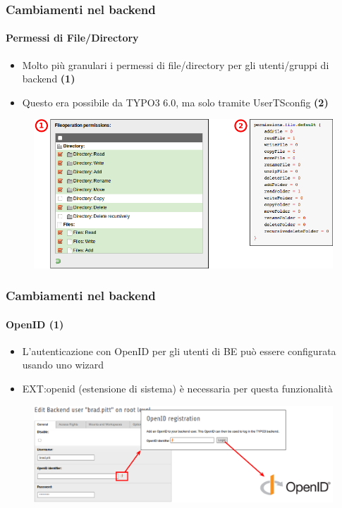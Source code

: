
\begin{frame}[fragile]
	\frametitle{Cambiamenti nel backend}
	\framesubtitle{Permessi di File/Directory}

 	\begin{itemize}
		\item Molto più granulari i permessi di file/directory per gli utenti/gruppi di backend
			\begingroup\color{typo3red}\textbf{(1)}\endgroup
		\item Questo era possibile da TYPO3 6.0, ma solo tramite UserTSconfig
			\begingroup\color{typo3red}\textbf{(2)}\endgroup
	\end{itemize}

	\begin{figure}
		\includegraphics[width=0.75\linewidth]{Images/BackendChanges/FileAndDirectoryPermissions.png}
	\end{figure}

\end{frame}


\begin{frame}[fragile]
	\frametitle{Cambiamenti nel backend}
	\framesubtitle{OpenID (1)}

 	\begin{itemize}
		\item L'autenticazione con OpenID per gli utenti di BE può essere configurata usando uno wizard
		\item EXT:openid (estensione di sistema) è necessaria per questa funzionalità
	\end{itemize}

	\begin{figure}
		\includegraphics[width=0.95\linewidth]{Images/BackendChanges/OpenIdWizard.png}
	\end{figure}

\end{frame}

